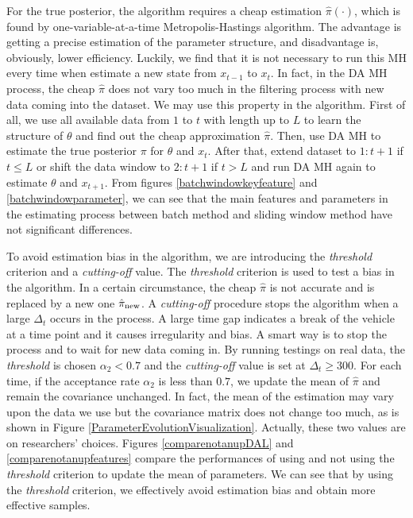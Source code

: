 For the true posterior, the algorithm requires a cheap estimation $\hat{\pi}(\cdot)$, which is found by one-variable-at-a-time Metropolis-Hastings algorithm. The advantage is getting a precise estimation of the parameter structure, and disadvantage is, obviously, lower efficiency. Luckily, we find that it is not necessary to run this MH every time when estimate a new state from $x_{t-1}$ to $x_t$. In fact, in the DA MH process, the cheap $\hat{\pi}$ does not vary too much in the filtering process with new data coming into the dataset. We may use this property in the algorithm. First of all, we use all available data from $1$ to $t$ with length up to $L$ to learn the structure of $\theta$ and find out the cheap approximation $\hat{\pi}$. Then, use DA MH to estimate the true posterior $\pi$ for $\theta$ and $x_t$. After that, extend dataset to $1:t+1$ if $t\leq L$ or shift the data window to $2:t+1$ if $t>L$ and run DA MH again to estimate $\theta$ and $x_{t+1}$. From figures \ref{batchwindowkeyfeature} and \ref{batchwindowparameter}, we can see that the main features and parameters in the estimating process between batch method and sliding window method have not significant differences. 


To avoid estimation bias in the algorithm, we are introducing the \textit{threshold} criterion and a \textit{cutting-off} value. The \textit{threshold} criterion is used to test  a bias in the algorithm. In a certain circumstance, the cheap $\hat{\pi}$ is not accurate and is replaced by a new one $\hat{\pi}_{\mbox{\scriptsize new}}$. A \textit{cutting-off} procedure stops the algorithm when a large $\Delta_t$ occurs in the process. A large time gap indicates a break of the vehicle at a time point and it causes irregularity and bias. A smart way is to stop the process and to wait for new data coming in. By running testings on real data, the \textit{threshold} is chosen $\alpha_2<0.7$ and the \textit{cutting-off} value is set at $\Delta_t\geq 300$. For each time, if the acceptance rate $\alpha_2$ is less than $0.7$, we update the mean of $\hat{\pi}$ and remain the covariance unchanged. In fact, the mean of the estimation may vary upon the data we use but the covariance matrix does not change too much, as is shown in Figure \ref{ParameterEvolutionVisualization}. Actually, these two values are on researchers' choices. Figures \ref{comparenotanupDAL} and \ref{comparenotanupfeatures} compare the performances of using and not using the \textit{threshold} criterion to update the mean of parameters. We can see that by using the \textit{threshold} criterion, we effectively avoid estimation bias and obtain more effective samples. 

